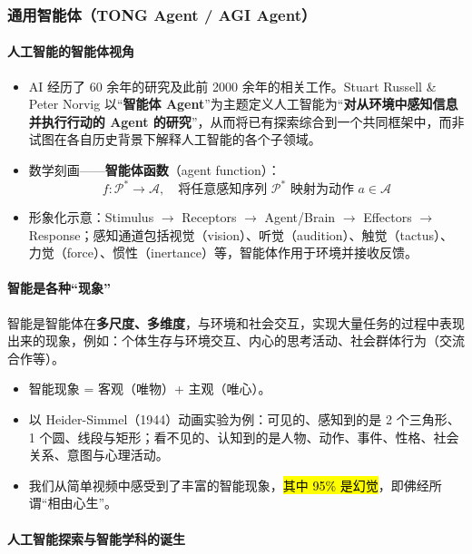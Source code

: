\subsubsection{通用智能体（TONG Agent / AGI Agent）}

\paragraph{人工智能的智能体视角}

\begin{itemize}[itemsep=2pt]
    \item AI 经历了 60 余年的研究及此前 2000 余年的相关工作。Stuart Russell \& Peter Norvig 以“\textbf{智能体 Agent}”为主题定义人工智能为“\textbf{对从环境中感知信息并执行行动的 Agent 的研究}”，从而将已有探索综合到一个共同框架中，而非试图在各自历史背景下解释人工智能的各个子领域。
    \item 数学刻画——\textbf{智能体函数}（agent function）：
    \[
        f: \mathcal{P}^* \to \mathcal{A}, \quad \text{将任意感知序列 } \mathcal{P}^* \text{ 映射为动作 } a \in \mathcal{A}
    \]
    \item 形象化示意：Stimulus $\to$ Receptors $\to$ Agent/Brain $\to$ Effectors $\to$ Response；感知通道包括视觉（vision）、听觉（audition）、触觉（tactus）、力觉（force）、惯性（inertance）等，智能体作用于环境并接收反馈。
\end{itemize}

\paragraph{智能是各种“现象”}

智能是智能体在\textbf{多尺度、多维度}，与环境和社会交互，实现大量任务的过程中表现出来的现象，例如：个体生存与环境交互、内心的思考活动、社会群体行为（交流合作等）。

\begin{itemize}[itemsep=2pt]
    \item 智能现象 = 客观（唯物）+ 主观（唯心）。
    \item 以 Heider-Simmel（1944）动画实验为例：可见的、感知到的是 2 个三角形、1 个圆、线段与矩形；看不见的、认知到的是人物、动作、事件、性格、社会关系、意图与心理活动。
    \item 我们从简单视频中感受到了丰富的智能现象，\hl{其中 95\% 是幻觉}，即佛经所谓“相由心生”。
\end{itemize}

\paragraph{人工智能探索与智能学科的诞生}

